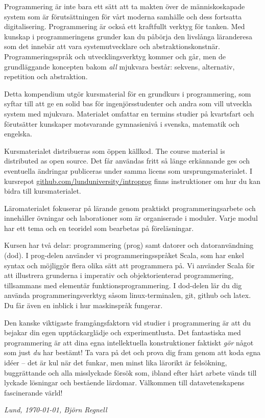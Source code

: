 


Programmering är inte bara ett sätt att ta makten över de människoskapade system som är förutsättningen för vårt moderna samhälle och dess fortsatta digitalisering. Programmering är också ett kraftfullt verktyg för tanken. Med kunskap i programmeringens grunder kan du påbörja den livslånga läranderesa som det innebär att vara systemutvecklare och abstraktionskonstnär. Programmeringsspråk och utvecklingsverktyg kommer och går, men de grundläggande koncepten bakom \emph{all} mjukvara består: sekvens, alternativ, repetition och abstraktion. 

Detta kompendium utgör kursmaterial för en grundkurs i programmering, som syftar till att ge en solid bas för ingenjörsstudenter och andra som vill utveckla system med mjukvara. Materialet omfattar en termins studier på kvartsfart och förutsätter kunskaper motsvarande gymnasienivå i svenska, matematik och engelska. 

\ifswedish Kursmaterialet distribueras som öppen källkod. \else The course material is distributed as open source.\fi{} Det får användas fritt så länge erkännande ges och eventuella ändringar publiceras under samma licens som ursprungsmaterialet. 
I kursrepot \href{http://github.com/lunduniversity/introprog}{github.com/lunduniversity/introprog} finns instruktioner om hur du kan bidra till kursmaterialet.

Läromaterialet fokuserar på lärande genom praktiskt programmeringsarbete och innehåller övningar och laborationer som är organiserade i moduler. Varje modul har ett tema och en teoridel som bearbetas på föreläsningar. 

Kursen har två delar: programmering (prog) samt datorer och datoranvändning (dod). I prog-delen använder vi programmeringsspråket Scala, som har enkel syntax och möjliggör flera olika sätt att programmera på. Vi använder Scala för att illustrera grunderna i imperativ och objektorienterad programmering, tillsammans med elementär funktionsprogrammering. I dod-delen lär du dig använda programmeringsverktyg såsom linux-terminalen, git, github och latex. Du får även en inblick i hur maskinspråk fungerar. 

Den kanske viktigaste framgångsfaktorn vid studier i programmering är att du bejakar din egen upptäckarglädje och experimentlusta. Det fantastiska med programmering är att dina egna intellektuella konstruktioner faktiskt \emph{gör} något som just \emph{du} har bestämt! Ta vara på det och prova dig fram genom att koda egna idéer -- det är kul när det funkar, men minst lika lärorikt är felsökning, buggrättande och alla misslyckade försök som, ibland efter hårt arbete vänds till lyckade lösningar och bestående lärdomar. Välkommen till datavetenskapens fascinerande värld!

\vspace{1em}\noindent \textit{\hfill Lund, \today, Björn Regnell}




